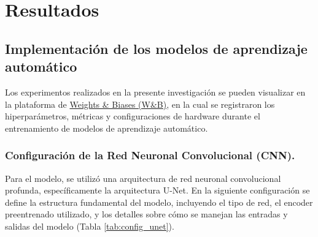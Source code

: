 \section{Resultados}
\subsection{Implementación de los modelos de aprendizaje automático}

Los experimentos realizados en la presente investigación se pueden visualizar en la plataforma de \href{https://wandb.ai/scigeo/scburning}{Weights \& Biases (W\&B)}, en la cual se 
registraron los hiperparámetros, métricas y configuraciones de hardware durante el entrenamiento de modelos de aprendizaje automático.

\subsubsection{Configuración de la Red Neuronal Convolucional (CNN).}
Para el modelo, se utilizó una arquitectura de red neuronal convolucional profunda, específicamente la arquitectura U-Net. En la siguiente configuración se define la estructura fundamental 
del modelo, incluyendo el tipo de red, el encoder preentrenado utilizado, y los detalles sobre cómo se manejan las entradas y salidas del modelo (Tabla \ref{tab:config_unet}). 

